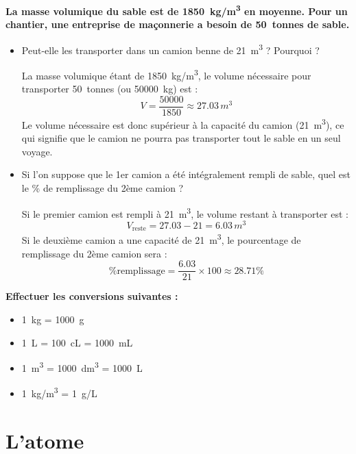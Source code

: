 \documentclass{exam}
\begin{document}
\begin{questions}
  \question[2] \textbf{La masse volumique du sable est de \SI{1850}{kg/m^3} en moyenne. Pour un chantier, une entreprise de maçonnerie a besoin de \SI{50}{tonnes} de sable.}

  \begin{itemize}
    \item Peut-elle les transporter dans un camion benne de \SI{21}{m^3} ? Pourquoi ?

    La masse volumique étant de \SI{1850}{kg/m^3}, le volume nécessaire pour transporter \SI{50}{tonnes} (ou \SI{50000}{kg}) est :
    \[
    V = \frac{50000}{1850} \approx 27.03\,\si{m^3}
    \]
    Le volume nécessaire est donc supérieur à la capacité du camion (\SI{21}{m^3}), ce qui signifie que le camion ne pourra pas transporter tout le sable en un seul voyage.

    \item Si l'on suppose que le 1er camion a été intégralement rempli de sable, quel est le \% de remplissage du 2ème camion ?

    Si le premier camion est rempli à \SI{21}{m^3}, le volume restant à transporter est :
    \[
    V_{\text{reste}} = 27.03 - 21 = 6.03\,\si{m^3}
    \]
    Si le deuxième camion a une capacité de \SI{21}{m^3}, le pourcentage de remplissage du 2ème camion sera :
    \[
    \text{\% remplissage} = \frac{6.03}{21} \times 100 \approx 28.71\%
    \]
  \end{itemize}

  \question[2] \textbf{Effectuer les conversions suivantes :}

  \begin{itemize}
    \item \SI{1}{kg} = \SI{1000}{g}
    \item \SI{1}{L} = \SI{100}{cL} = \SI{1000}{mL}
    \item \SI{1}{m^3} = \SI{1000}{dm^3} = \SI{1000}{L}
    \item \SI{1}{kg/m^3} = \SI{1}{g/L}
  \end{itemize}

\end{questions}

\section*{L'atome}
\end{document}
